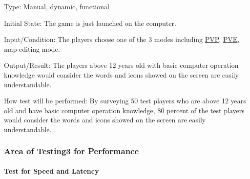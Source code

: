 \documentclass[12pt, titlepage]{article}
\begin{document}
\begin{enumerate}
Type: Manual, dynamic, functional
					
Initial State: The game is just launched on the computer. 
					
Input/Condition: The players choose one of the 3 modes including \underline{PVP}, \underline{PVE}, map editing mode.
					
Output/Result: The players above 12 years old with basic computer operation knowledge would consider the words and icons showed on the screen are easily understandable.
					
How test will be performed: By surveying 50 test players who are above 12 years old and have basic computer operation knowledge, 80 percent of the test players would consider the words and icons showed on the screen are easily understandable.

\end{enumerate}

\subsubsection{Area of Testing3 for Performance}
\paragraph{Test for Speed and Latency}
\end{document}
